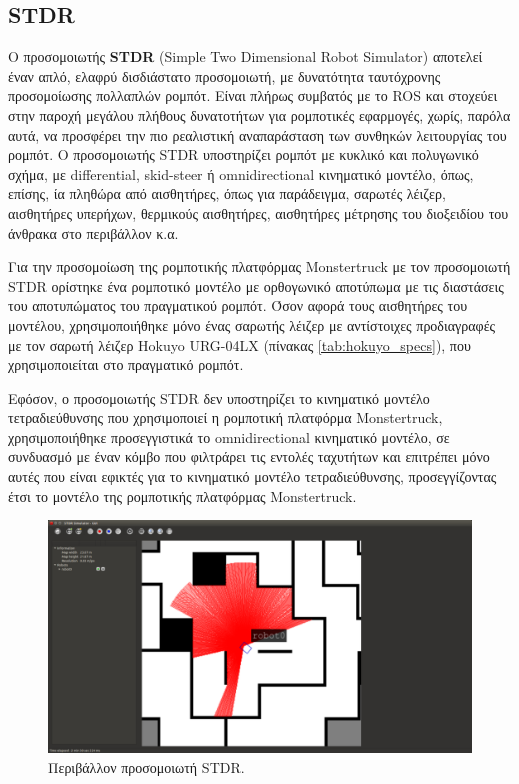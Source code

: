 \subsection{STDR} \label{ssec:stdr}
Ο προσομοιωτής \textbf{STDR} (Simple Two Dimensional Robot Simulator) αποτελεί έναν απλό, ελαφρύ δισδιάστατο προσομοιωτή, με δυνατότητα ταυτόχρονης προσομοίωσης πολλαπλών ρομπότ. Είναι πλήρως συμβατός με το ROS και στοχεύει στην παροχή μεγάλου πλήθους δυνατοτήτων για ρομποτικές εφαρμογές, χωρίς, παρόλα αυτά, να προσφέρει την πιο ρεαλιστική αναπαράσταση των συνθηκών λειτουργίας του ρομπότ. Ο προσομοιωτής STDR υποστηρίζει ρομπότ με κυκλικό και πολυγωνικό σχήμα, με differential, skid-steer ή omnidirectional κινηματικό μοντέλο, όπως, επίσης, ία πληθώρα από αισθητήρες, όπως για παράδειγμα, σαρωτές λέιζερ, αισθητήρες υπερήχων, θερμικούς αισθητήρες, αισθητήρες μέτρησης του διοξειδίου του άνθρακα στο περιβάλλον κ.α. 

\bigskip
Για την προσομοίωση της ρομποτικής πλατφόρμας Monstertruck με τον προσομοιωτή STDR ορίστηκε ένα ρομποτικό μοντέλο με ορθογωνικό αποτύπωμα με τις διαστάσεις του αποτυπώματος του πραγματικού ρομπότ. Όσον αφορά τους αισθητήρες του μοντέλου, χρησιμοποιήθηκε μόνο ένας σαρωτής λέιζερ με αντίστοιχες προδιαγραφές με τον σαρωτή λέιζερ Hokuyo URG-04LX  (πίνακας \ref{tab:hokuyo_specs}), που χρησιμοποιείται στο πραγματικό ρομπότ.

\bigskip
Εφόσον, ο προσομοιωτής STDR δεν υποστηρίζει το κινηματικό μοντέλο τετραδιεύθυνσης που χρησιμοποιεί η ρομποτική πλατφόρμα Monstertruck, χρησιμοποιήθηκε προσεγγιστικά το omnidirectional κινηματικό μοντέλο, σε συνδυασμό με έναν κόμβο που φιλτράρει τις εντολές ταχυτήτων και επιτρέπει μόνο αυτές που είναι εφικτές για το κινηματικό μοντέλο τετραδιεύθυνσης, προσεγγίζοντας έτσι το μοντέλο της ρομποτικής πλατφόρμας Monstertruck.

\begin{figure}[!ht]
	\centering
	\includegraphics[width=0.7\linewidth]{Chapters/Chapter4/Figures/stdr_simulator.png}
	\caption{Περιβάλλον προσομοιωτή STDR.}
	\label{fig:stdr_simulator}
\end{figure}

